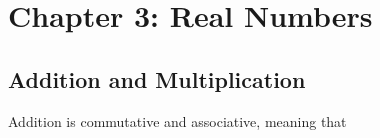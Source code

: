 \section{Chapter 3: Real Numbers}
\subsection{Addition and Multiplication}
\begin{addition}
Addition is commutative and associative, meaning that

\end{addition}
